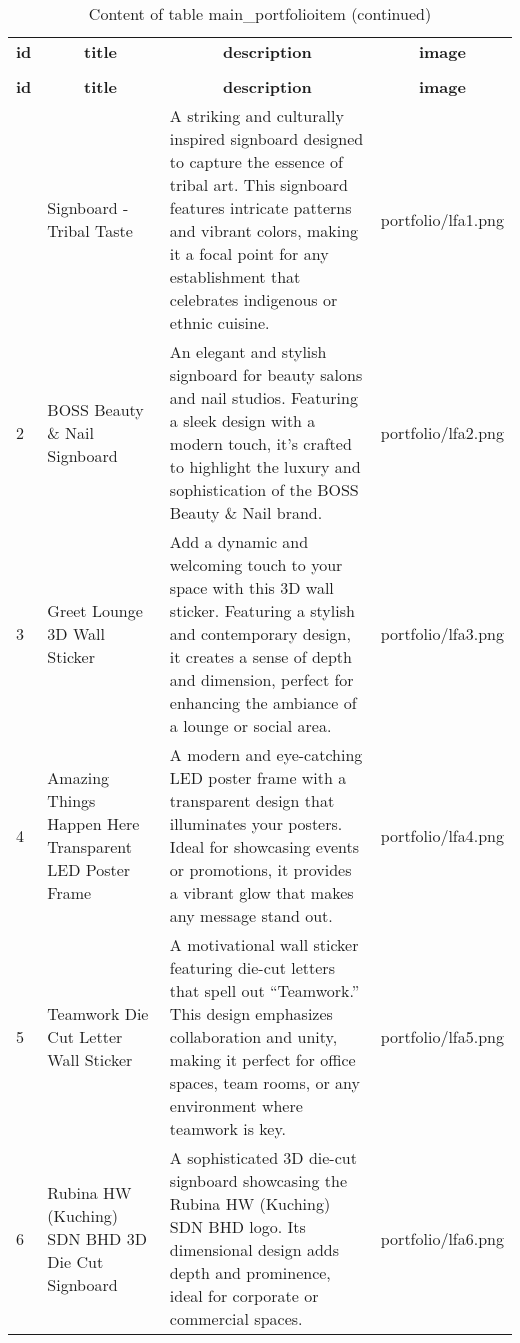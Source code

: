 %
%
 \begin{longtable}{|l|l|l|l|} 
 \hline \endhead \hline \endfoot \hline 
 \caption{Content of table main\_portfolioitem} \label{tab:main_portfolioitem-data} \\\hline \multicolumn{1}{|c|}{\textbf{id}} & \multicolumn{1}{|c|}{\textbf{title}} & \multicolumn{1}{|c|}{\textbf{description}} & \multicolumn{1}{|c|}{\textbf{image}} \\ \hline \hline  \endfirsthead 
\caption{Content of table main\_portfolioitem (continued)} \\ \hline \multicolumn{1}{|c|}{\textbf{id}} & \multicolumn{1}{|c|}{\textbf{title}} & \multicolumn{1}{|c|}{\textbf{description}} & \multicolumn{1}{|c|}{\textbf{image}} \\ \hline \hline \endhead \endfoot
1 & Signboard - Tribal Taste & A striking and culturally inspired signboard designed to capture the essence of tribal art. This signboard features intricate patterns and vibrant colors, making it a focal point for any establishment that celebrates indigenous or ethnic cuisine. & portfolio/lfa1.png \\ \hline 
2 & BOSS Beauty \& Nail Signboard & An elegant and stylish signboard for beauty salons and nail studios. Featuring a sleek design with a modern touch, it’s crafted to highlight the luxury and sophistication of the BOSS Beauty \& Nail brand. & portfolio/lfa2.png \\ \hline 
3 & Greet Lounge 3D Wall Sticker & Add a dynamic and welcoming touch to your space with this 3D wall sticker. Featuring a stylish and contemporary design, it creates a sense of depth and dimension, perfect for enhancing the ambiance of a lounge or social area. & portfolio/lfa3.png \\ \hline 
4 & Amazing Things Happen Here Transparent LED Poster Frame & A modern and eye-catching LED poster frame with a transparent design that illuminates your posters. Ideal for showcasing events or promotions, it provides a vibrant glow that makes any message stand out. & portfolio/lfa4.png \\ \hline 
5 & Teamwork Die Cut Letter Wall Sticker & A motivational wall sticker featuring die-cut letters that spell out “Teamwork.” This design emphasizes collaboration and unity, making it perfect for office spaces, team rooms, or any environment where teamwork is key. & portfolio/lfa5.png \\ \hline 
6 & Rubina HW (Kuching) SDN BHD 3D Die Cut Signboard & A sophisticated 3D die-cut signboard showcasing the Rubina HW (Kuching) SDN BHD logo. Its dimensional design adds depth and prominence, ideal for corporate or commercial spaces. & portfolio/lfa6.png \\ \hline 

\end{longtable}
